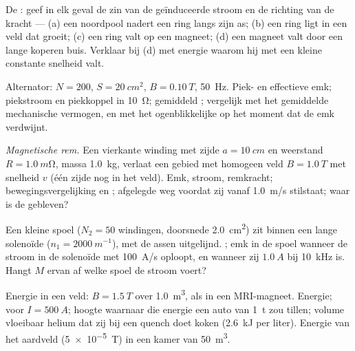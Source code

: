 \begin{exercise}[$\star\star$]\label{exo:b1:induction:5}
De : geef in elk geval de zin van de geïnduceerde stroom en de richting van
de kracht --- (a) een noordpool nadert een ring langs
zijn as; (b) een ring ligt in een veld dat groeit; (c) een ring valt
op een magneet; (d) een magneet valt door een lange koperen buis. Verklaar bij (d)
met energie waarom hij met een kleine constante snelheid valt.
\end{exercise}

\begin{exercise}[$\star\star$]\label{exo:b1:induction:6}
Alternator: $N = 200$, $S = \qty{20}{cm^2}$, $B = \qty{0.10}{T}$, \qty{50}{Hz}.
Piek- en effectieve emk; piekstroom en piekkoppel in \qty{10}{\ohm}; gemiddeld
; vergelijk met het gemiddelde mechanische vermogen, en met het
ogenblikkelijke  op het moment dat de emk verdwijnt.
\end{exercise}

\begin{exercise}[$\star\star$]\label{exo:b1:induction:7}
\emph{Magnetische rem.} Een vierkante winding met zijde $a = \qty{10}{cm}$ en
weerstand $R = \qty{1.0}{m\ohm}$, massa \qty{1.0}{kg}, verlaat een gebied met
homogeen veld $B = \qty{1.0}{T}$ met snelheid $v$ (één zijde nog in het
veld). Emk, stroom, remkracht; bewegingsvergelijking en ;
afgelegde weg voordat zij vanaf \qty{1.0}{m/s} stilstaat; waar is
de  gebleven?
\end{exercise}

\begin{exercise}[$\star\star$]\label{exo:b1:induction:8}
Een kleine spoel ($N_2 = 50$ windingen, doorsnede \qty{2.0}{cm^2}) zit binnen een
lange solenoïde ($n_1 = \qty{2000}{m^{-1}}$), met de assen uitgelijnd. ; emk in de spoel wanneer de stroom in de solenoïde met
\qty{100}{A/s} oploopt, en wanneer zij $\qty{1.0}{A}$ bij \qty{10}{kHz} is. Hangt $M$
ervan af welke spoel de stroom voert?
\end{exercise}

\begin{exercise}[$\star\star$]\label{exo:b1:induction:9}
Energie in een veld: $B = \qty{1.5}{T}$ over \qty{1.0}{m^3}, als in een
MRI-magneet. Energie;  voor $I = \qty{500}{A}$; hoogte waarnaar die
energie een auto van \qty{1}{t} zou tillen; volume vloeibaar helium dat zij
bij een quench doet koken (\qty{2.6}{kJ} per liter). Energie van het aardveld
(\qty{5e-5}{T}) in een kamer van \qty{50}{m^3}.
\end{exercise}

